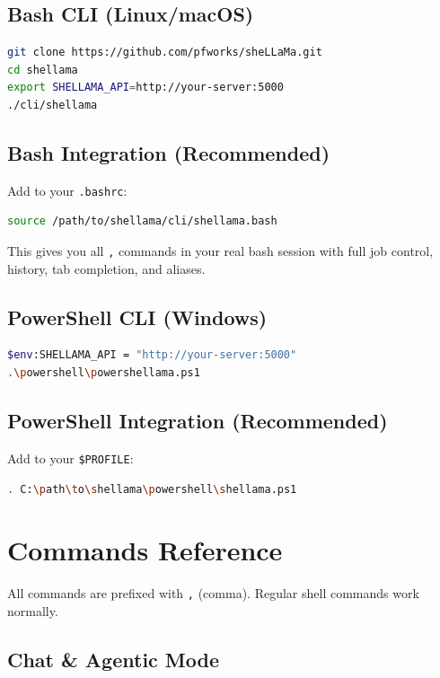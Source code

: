 \documentclass[11pt,a4paper]{article}
\begin{document}
\subsection{Bash CLI (Linux/macOS)}
\begin{lstlisting}[language=bash]
git clone https://github.com/pfworks/sheLLaMa.git
cd shellama
export SHELLAMA_API=http://your-server:5000
./cli/shellama
\end{lstlisting}

\subsection{Bash Integration (Recommended)}
Add to your \texttt{.bashrc}:
\begin{lstlisting}[language=bash]
source /path/to/shellama/cli/shellama.bash
\end{lstlisting}
This gives you all \texttt{,} commands in your real bash session with full job control, history, tab completion, and aliases.

\subsection{PowerShell CLI (Windows)}
\begin{lstlisting}[language=bash]
$env:SHELLAMA_API = "http://your-server:5000"
.\powershell\powershellama.ps1
\end{lstlisting}

\subsection{PowerShell Integration (Recommended)}
Add to your \texttt{\$PROFILE}:
\begin{lstlisting}[language=bash]
. C:\path\to\shellama\powershell\shellama.ps1
\end{lstlisting}

\section{Commands Reference}

All commands are prefixed with \texttt{,} (comma). Regular shell commands work normally.

\subsection{Chat \& Agentic Mode}
\end{document}
